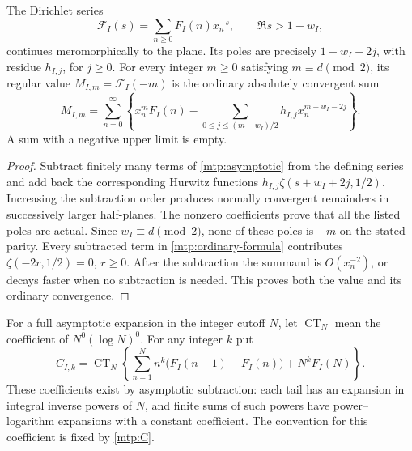 \begin{proposition}
\label{mtp:ordinary}
The Dirichlet series
\[
                 \mathcal F_I(s)=\sum_{n\ge0}F_I(n)x_n^{-s},
                    \qquad \Re s>1-w_I,
\]
continues meromorphically to the plane. Its poles are precisely
$1-w_I-2j$, with residue $h_{I,j}$, for $j\ge0$. For every integer
$m\ge0$ satisfying $m\equiv d\pmod2$, its regular value
$M_{I,m}=\mathcal F_I(-m)$ is the ordinary absolutely convergent sum
\begin{equation}\label{mtp:ordinary-formula}
 \boxed{M_{I,m}=\sum_{n=0}^{\infty}\left\{
       x_n^mF_I(n)
       -\sum_{0\le j\le(m-w_I)/2}h_{I,j}x_n^{m-w_I-2j}
                                     \right\}.}
\end{equation}
A sum with a negative upper limit is empty.
\end{proposition}

\begin{proof}
Subtract finitely many terms of \eqref{mtp:asymptotic} from the defining
series and add back the corresponding Hurwitz functions
$h_{I,j}\zeta(s+w_I+2j,1/2)$. Increasing the subtraction order produces
normally convergent remainders in successively larger half-planes.
The nonzero coefficients prove that all the listed poles are actual.
Since $w_I\equiv d\pmod2$, none of these poles is $-m$ on the stated
parity. Every subtracted term in \eqref{mtp:ordinary-formula} contributes
$\zeta(-2r,1/2)=0$, $r\ge0$. After the subtraction the summand is
$O(x_n^{-2})$, or decays faster when no subtraction is needed.
This proves both the value and its ordinary convergence.
\end{proof}

For a full asymptotic expansion in the integer cutoff $N$, let
$\operatorname{CT}_N$ mean the coefficient of $N^0(\log N)^0$.
For any integer $k$ put
\begin{equation}\label{mtp:C}
 C_{I,k}=\operatorname{CT}_N\left\{
     \sum_{n=1}^N n^k\bigl(F_I(n-1)-F_I(n)\bigr)+N^kF_I(N)\right\}.
\end{equation}
These coefficients exist by asymptotic subtraction: each tail has an
expansion in integral inverse powers of $N$, and finite sums of such
powers have power--logarithm expansions with a constant coefficient.
The convention for this coefficient is fixed by \eqref{mtp:C}.

